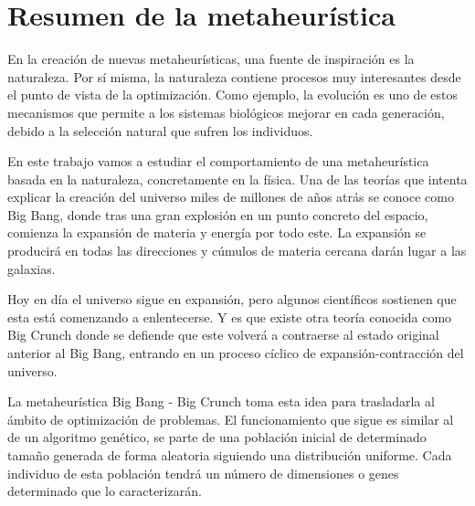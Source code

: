 \newpage %

\tableofcontents %

\newpage




\part{Resumen de la metaheurística}

En la creación de nuevas metaheurísticas, una fuente de inspiración es la naturaleza. Por sí misma, la naturaleza contiene procesos muy interesantes desde el punto de vista de la optimización. Como ejemplo, la evolución es uno de estos mecanismos que permite a los sistemas biológicos mejorar en cada generación, debido a la selección natural que sufren los individuos.

En este trabajo vamos a estudiar el comportamiento de una metaheurística basada en la naturaleza, concretamente en la física. Una de las teorías que intenta explicar la creación del universo miles de millones de años atrás se conoce como Big Bang, donde tras una gran explosión en un punto concreto del espacio, comienza la expansión de materia y energía por todo este. La expansión se producirá en todas las direcciones y cúmulos de materia cercana darán lugar a las galaxias. 

Hoy en día el universo sigue en expansión, pero algunos científicos sostienen que esta está comenzando a enlentecerse. Y es que existe otra teoría conocida como Big Crunch donde se defiende que este volverá a contraerse al estado original anterior al Big Bang, entrando en un proceso cíclico de expansión-contracción del universo.

La metaheurística Big Bang - Big Crunch \cite{EROL2006106} toma esta idea para trasladarla al ámbito de optimización de problemas. El funcionamiento que sigue es similar al de un algoritmo genético, se parte de una población inicial de determinado tamaño generada de forma aleatoria siguiendo una distribución uniforme. Cada individuo de esta población tendrá un número de dimensiones o genes determinado que lo caracterizarán.

